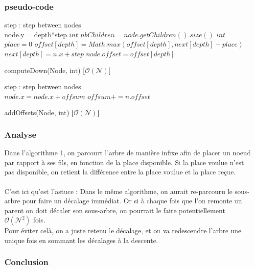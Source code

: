 \documentclass[11pt]{report}
\begin{document}
\subsubsection{pseudo-code}
\begin{algorithm}[H]
step : step between nodes\\
 node.y = depth*step\;
 $int$ $nbChildren = node.getChildren().size()$\; 
 $int$ $place = 0$\;
$offset[depth] = Math.max(offset[depth], next[depth]-place)$\;
$next[depth] = n.x+step$\;
$node.offset = offset[depth]$\;
 \caption{computeDown(Node, int) \textbf{[$\mathcal{O(N)}$]}}
\end{algorithm}

\begin{algorithm}[H]
step : step between nodes\\
 $node.x = node.x + offsum$\;
 $ offsum += n.offset$\;
 \caption{addOffsets(Node, int) \textbf{[$\mathcal{O(N)}$]}}
\end{algorithm}
\subsubsection{Analyse}
Dans l'algorithme 1, on parcourt l'arbre de manière infixe afin de placer un noeud par rapport à ses fils, en fonction de la place disponible. Si la place voulue n'est pas disponible, on retient la différence entre la place voulue et la place reçue.\\
\\
C'est ici qu'est l'astuce :
Dans le même algorithme, on aurait re-parcouru le sous-arbre pour faire un décalage immédiat. Or si à chaque fois que l'on remonte un parent on doit décaler son sous-arbre, on pourrait le faire potentiellement \textbf{$\mathcal{O(N^2)}$} fois.\\
Pour éviter celà, on a juste retenu le décalage, et on va redescendre l'arbre une unique fois en sommant les décalages à la descente.\\
\subsubsection{Conclusion}
\end{document}
